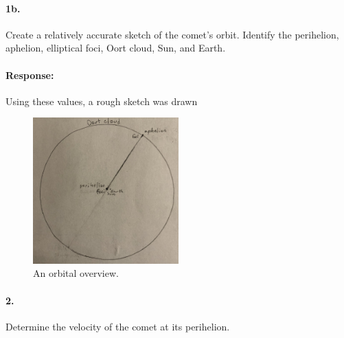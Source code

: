 \documentclass[12pt]{article}
\begin{document}
	\paragraph{1b.}
	Create a relatively accurate sketch of the comet's orbit. Identify the perihelion, aphelion, elliptical	foci, Oort cloud, Sun, and Earth.

	\paragraph{Response:}
		
		Using these values, a rough sketch was drawn
		\begin{figure}[H]
			\centerline{\includegraphics[width=0.5\textwidth]{orbital_overview.eps}}
			\caption{An orbital overview.}
		\end{figure}

	\paragraph{2.}
	Determine the velocity of the comet at its perihelion.
\end{document}

